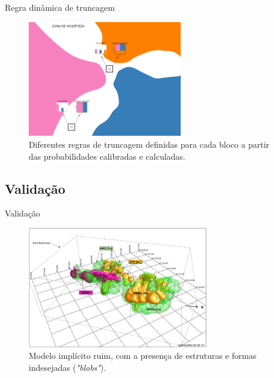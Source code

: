 \documentclass[aspectratio=169]{beamer}
\begin{document}
\begin{frame}{Regra dinâmica de truncagem}
\begin{figure}[H]
	\caption{\label{trunc_rules_prop}Diferentes regras de truncagem definidas para cada bloco a partir das probabilidades calibradas e calculadas.}
	\begin{center}
		\includegraphics[width=0.6\textwidth]{capitulo_3/trunc_rules_prop.jpg}
	\end{center}
\end{figure}	
\end{frame}

\subsection{Validação}

\begin{frame}{Validação}
	\begin{figure}[H]
		\caption{\label{blob}Modelo implícito ruim, com a presença de estruturas e formas indesejadas (\textit{"blobs"}).}
		\begin{center}
			\includegraphics[width=0.7\textwidth]{capitulo_3/blob.jpg}
		\end{center}
	\end{figure}
\end{frame}
\end{document}
